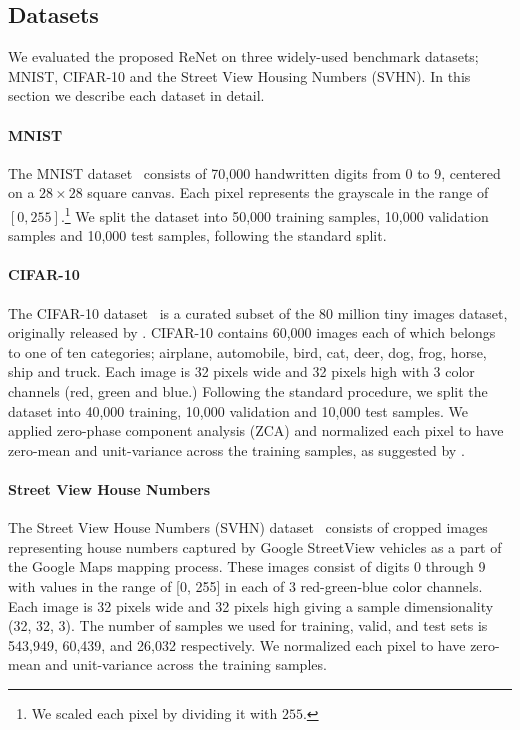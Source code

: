 \subsection{Datasets}

We evaluated the proposed ReNet on three widely-used benchmark datasets; MNIST,
CIFAR-10 and the Street View Housing Numbers (SVHN). In this section we describe
each dataset in detail.

\paragraph{MNIST}
The MNIST dataset~\citep{Lecun99objectrecognition} consists of 70,000
handwritten digits from 0 to 9, centered on a $28\times 28$ square canvas. Each
pixel represents the grayscale in the range of $\left[0, 255\right]$.\footnote{
    We scaled each pixel by dividing it with $255$.
}
We split the dataset into 50,000 training samples, 10,000 validation
samples and 10,000 test samples, following the standard split.

\paragraph{CIFAR-10}
The CIFAR-10 dataset~\citep{KrizhevskyHinton2009} is a curated subset of the 80
million tiny images dataset, originally released by
\citet{Torralba+Fergus+Freeman-2008}. CIFAR-10 contains 60,000 images each of which
belongs to one of ten categories; airplane, automobile, bird, cat, deer, dog,
frog, horse, ship and truck. Each image is 32 pixels wide and 32 pixels high
with 3 color channels (red, green and blue.) Following the standard procedure,
we split the dataset into 40,000 training, 10,000 validation and 10,000 test
samples. We applied zero-phase component analysis (ZCA) and normalized each pixel
to have zero-mean and unit-variance across the training
samples, as suggested by \citet{KrizhevskyHinton2009}.

\paragraph{Street View House Numbers}
The Street View House Numbers (SVHN) dataset~\citep{Netzer-wkshp-2011} consists
of cropped images representing house numbers captured by Google StreetView
vehicles as a part of the Google Maps mapping process. These images consist of
digits 0 through 9 with values in the range of [0, 255] in each of 3
red-green-blue color channels. Each image is 32 pixels wide and 32 pixels
high giving a sample dimensionality (32, 32, 3). The number of samples we used for
training, valid, and test sets is 543,949, 60,439, and 26,032 respectively. We
normalized each pixel to have zero-mean and unit-variance across the training
samples.

